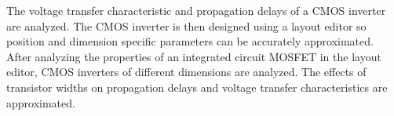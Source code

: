 The voltage transfer characteristic and propagation delays of a CMOS inverter are analyzed. The CMOS inverter is then designed using a layout editor so position and dimension specific parameters can be accurately approximated. After analyzing the properties of an integrated circuit MOSFET in the layout editor, CMOS inverters of different dimensions are analyzed. The effects of transistor widths on propagation delays and voltage transfer characteristics are approximated.
